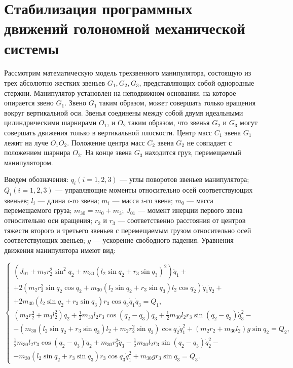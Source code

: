 
\section{Стабилизация программных движений голономной механической системы } \label{p31}
\paragraph{}
 Рассмотрим математическую модель трехзвенного манипулятора, состоящую из трех абсолютно жестких звеньев $G_1, G_2, G_3$, представляющих собой однородные стержни. Манипулятор установлен на неподвижном основании, на которое опирается звено $G_1$. Звено $G_1$ таким образом, может совершать только вращения вокруг вертикальной оси. Звенья соединены между собой двумя идеальными цилиндрическими шарнирами $O_1$, и $O_2$ таким образом, что звенья $G_2$ и $G_3$ могут совершать движения только в вертикальной плоскости. Центр масс $C_1$ звена $G_1$ лежит на луче  $O_1 O_2$. Положение центра масс $C_2$ звена $G_2$ не совпадает с положением шарнира $O_2$. На конце звена $G_3$ находится груз, перемещаемый манипулятором.
 
 Введем обозначения: $q_i (i=1, 2, 3)$ --- углы поворотов звеньев манипулятора; $Q_i (i = 1, 2, 3)$ ---  управляющие моменты относительно осей соответствующих звеньев; $l_i$  ---  длина   $i$-го звена;   $m_i$ --- масса  $i$-го звена;    $m_0$ ---  масса перемещаемого груза;  $m_{30} = m_0 + m_3$; $J_{01}$  ---  момент инерции первого звена относительно оси вращения; $r_2$ и $r_3$ --- соответственно расстояния от центров тяжести второго и третьего звеньев с перемещаемым грузом относительно осей соответствующих звеньев; $g$ --- ускорение свободного падения.
 Уравнения движения манипулятора имеют вид:
 
 \begin{equation}
 \begin{cases}
 (J_{01} + m_2 r_2^2 \sin^2 q_2 + m_{30} (l_2 \sin q_2 + r_3 \sin q_3)^2) \ddot q_1 + \\ + 2 (m_2 r_2^2 \sin q_2 \cos q_2 + m_{30} (l_2 \sin q_2 + r_3 \sin q_3) l_2 \cos q_2) \dot q_1 \dot q_2 + \\ + 2 m_{30} (l_2 \sin q_2 + r_3 \sin q_3) r_3 \cos q_3 \dot q_1 \dot q_3 = Q_1,
 \\
 (m_2 r_2^2 + m_3 l_2^2) \ddot q_2 + \frac12 m_{30} l_2 r_3 \cos(q_2 - q_3) \ddot q_3 + \frac12 m_{30} l_2 r_3 \sin (q_2 - q_3) \dot q_3^2 - \\ - (m_{30} (l_2 \sin q_2 + r_3 \sin q_3) l_2 + m_2 r_2^2 \sin q_2) \cos q_2 \dot q_1^2 + (m_2 r_2 + m_{30} l_2) g \sin q_2 = Q_2,
 \\
 \frac12 m_{30} l_2 r_3 \cos(q_2 - q_3) \ddot q_2 + m_{30} r_3^2 \ddot q_3 - \frac12 m_{30} l_2 r_3 \sin (q_2 - q_3) \dot q_2^2 - \\ - m_{30} (l_2 \sin q_2 + r_3 \sin q_3) r_3 \cos q_3 \dot q_1^2 + m_{30} g r_3 \sin q_3 = Q_3.
 \end{cases}
 \end{equation}
 

